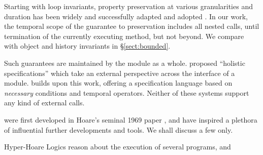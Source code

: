  
 Starting with loop invariants\cite{Hoare69,Floyd67}, property preservation at various granularities and duration has been widely and successfully adapted and adopted \cite{Hoare74,liskov94behavioral,usinghistory,Cohen10,Meyer92,MeyerDBC92,BarDelFahLeiSch04,objInvars,MuellerPoetzsch-HeffterLeavens06,DrossoFrancaMuellerSummers08}.
In our work, the temporal scope of the guarantee to preservation includes all nested calls, until termination of the currently executing method, but not beyond. 
We compare with object and history invariants in \S \ref{sect:bounded}.

Such guarantees are maintained by the module as a whole.
\citet{FASE}  proposed ``holistic specifications'' which take an external
perspective across the interface of a module. %
\citet{OOPSLA22} builds upon this work, offering a specification
language based on \emph{necessary} conditions and temporal operators.
Neither of these systems support any kind of external calls.


 were first developed in Hoare's seminal 1969 paper \cite{Hoare69}, and have inspired a plethora of influential further developments and tools. We shall discuss a few only.

%
Hyper-Hoare Logics \cite{hyper-hoare-pldi2024,compositional-hypersafety-oopsla2022}  reason about the execution of several programs, and  

